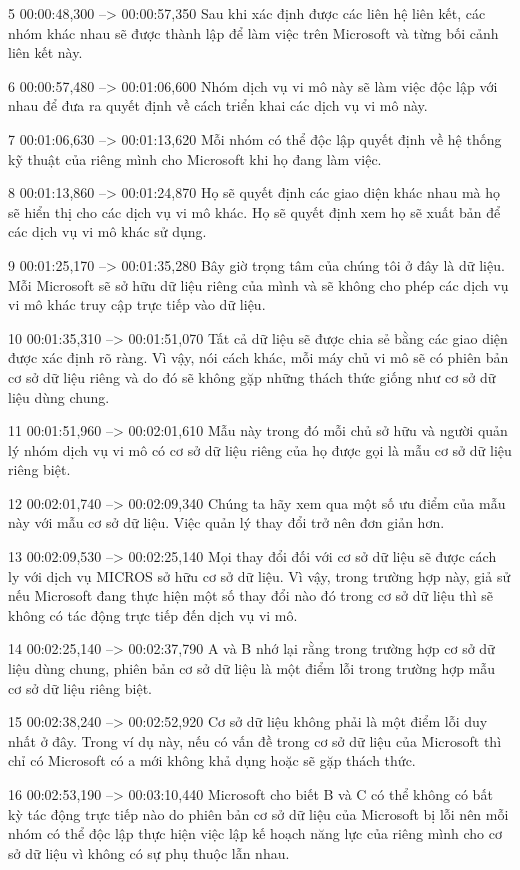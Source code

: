 5
00:00:48,300 --> 00:00:57,350
Sau khi xác định được các liên hệ liên kết, các nhóm khác nhau sẽ được thành lập để làm việc trên Microsoft và từng bối cảnh liên kết này.

6
00:00:57,480 --> 00:01:06,600
Nhóm dịch vụ vi mô này sẽ làm việc độc lập với nhau để đưa ra quyết định về cách triển khai các dịch vụ vi mô này.

7
00:01:06,630 --> 00:01:13,620
Mỗi nhóm có thể độc lập quyết định về hệ thống kỹ thuật của riêng mình cho Microsoft khi họ đang làm việc.

8
00:01:13,860 --> 00:01:24,870
Họ sẽ quyết định các giao diện khác nhau mà họ sẽ hiển thị cho các dịch vụ vi mô khác.  Họ sẽ quyết định xem họ sẽ xuất bản để các dịch vụ vi mô khác sử dụng.

9
00:01:25,170 --> 00:01:35,280
Bây giờ trọng tâm của chúng tôi ở đây là dữ liệu.  Mỗi Microsoft sẽ sở hữu dữ liệu riêng của mình và sẽ không cho phép các dịch vụ vi mô khác truy cập trực tiếp vào dữ liệu.

10
00:01:35,310 --> 00:01:51,070
Tất cả dữ liệu sẽ được chia sẻ bằng các giao diện được xác định rõ ràng.  Vì vậy, nói cách khác, mỗi máy chủ vi mô sẽ có phiên bản cơ sở dữ liệu riêng và do đó sẽ không gặp những thách thức giống như cơ sở dữ liệu dùng chung.

11
00:01:51,960 --> 00:02:01,610
Mẫu này trong đó mỗi chủ sở hữu và người quản lý nhóm dịch vụ vi mô có cơ sở dữ liệu riêng của họ được gọi là mẫu cơ sở dữ liệu riêng biệt.

12
00:02:01,740 --> 00:02:09,340
Chúng ta hãy xem qua một số ưu điểm của mẫu này với mẫu cơ sở dữ liệu.  Việc quản lý thay đổi trở nên đơn giản hơn.

13
00:02:09,530 --> 00:02:25,140
Mọi thay đổi đối với cơ sở dữ liệu sẽ được cách ly với dịch vụ MICROS sở hữu cơ sở dữ liệu.  Vì vậy, trong trường hợp này, giả sử nếu Microsoft đang thực hiện một số thay đổi nào đó trong cơ sở dữ liệu thì sẽ không có tác động trực tiếp đến dịch vụ vi mô.

14
00:02:25,140 --> 00:02:37,790
A và B nhớ lại rằng trong trường hợp cơ sở dữ liệu dùng chung, phiên bản cơ sở dữ liệu là một điểm lỗi trong trường hợp mẫu cơ sở dữ liệu riêng biệt.

15
00:02:38,240 --> 00:02:52,920
Cơ sở dữ liệu không phải là một điểm lỗi duy nhất ở đây.  Trong ví dụ này, nếu có vấn đề trong cơ sở dữ liệu của Microsoft thì chỉ có Microsoft có a mới không khả dụng hoặc sẽ gặp thách thức.

16
00:02:53,190 --> 00:03:10,440
Microsoft cho biết B và C có thể không có bất kỳ tác động trực tiếp nào do phiên bản cơ sở dữ liệu của Microsoft bị lỗi nên mỗi nhóm có thể độc lập thực hiện việc lập kế hoạch năng lực của riêng mình cho cơ sở dữ liệu vì không có sự phụ thuộc lẫn nhau.

